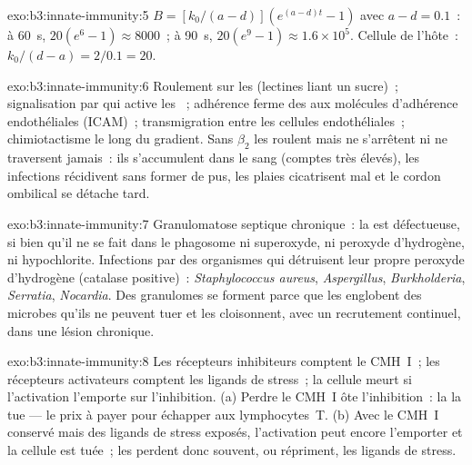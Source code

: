 \begin{solution}{exo:b3:innate-immunity:5}
$B = [k_{0}/(a-d)](e^{(a-d)t} - 1)$ avec $a - d = 0.1$~: à \qty{60}{s},
$20(e^{6} - 1) \approx 8000$~; à \qty{90}{s}, $20(e^{9} - 1) \approx
1.6\times 10^{5}$. Cellule de l'hôte~: $k_{0}/(d - a) = 2/0.1 = 20$.
\end{solution}

\begin{solution}{exo:b3:innate-immunity:6}
Roulement sur les  (lectines liant un sucre)~; signalisation
par  qui active les ~; adhérence ferme des
 aux molécules d'adhérence endothéliales (ICAM)~;
transmigration entre les cellules endothéliales~; chimiotactisme le long
du gradient. Sans 
$\beta_{2}$ les  roulent mais ne s'arrêtent ni ne traversent
jamais~: ils s'accumulent dans le sang (comptes très élevés), les
infections récidivent sans former de pus, les plaies cicatrisent mal et
le cordon ombilical se détache tard.
\end{solution}

\begin{solution}{exo:b3:innate-immunity:7}
Granulomatose septique chronique~: la  est défectueuse, si
bien qu'il ne se fait dans le phagosome ni superoxyde, ni peroxyde
d'hydrogène, ni hypochlorite. Infections par des organismes qui
détruisent leur propre peroxyde d'hydrogène (catalase positive)~:
\emph{Staphylococcus aureus}, \emph{Aspergillus},
\emph{Burkholderia}, \emph{Serratia}, \emph{Nocardia}. Des granulomes se
forment parce que les  englobent des microbes qu'ils ne
peuvent tuer et les cloisonnent, avec un recrutement continuel, dans une
lésion chronique.
\end{solution}

\begin{solution}{exo:b3:innate-immunity:8}
Les récepteurs inhibiteurs comptent le CMH~I~; les récepteurs
activateurs comptent les ligands de stress~; la cellule meurt si
l'activation l'emporte sur l'inhibition. (a) Perdre le CMH~I ôte
l'inhibition~: la  la tue --- le prix à payer
pour échapper aux lymphocytes~T. (b) Avec le CMH~I conservé mais des
ligands de stress exposés, l'activation peut encore l'emporter et la
cellule est tuée~; les  perdent donc souvent, ou répriment, les
ligands de stress.
\end{solution}

